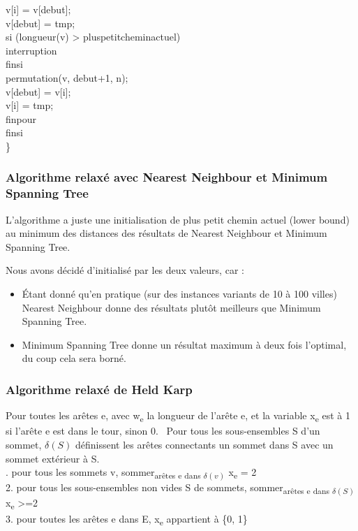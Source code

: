 \documentclass[12pt]{report}
\begin{document}
{{{{{{{\indent \indent \indent v[i] = v[debut];\\
\indent \indent \indent v[debut] = tmp;\\
\indent \indent \indent si (longueur(v) > pluspetitcheminactuel)\\
\indent\indent\indent\indent interruption\\
\indent\indent\indent finsi\\
\indent \indent \indent permutation(v, debut+1, n);\\
\indent \indent \indent v[debut] = v[i];\\
\indent \indent \indent v[i] = tmp;\\
\indent \indent finpour\\
\indent finsi \\
\}


\subsubsection{Algorithme relaxé avec Nearest Neighbour et Minimum Spanning Tree}

L'algorithme a juste une initialisation de plus petit chemin actuel (lower bound) au minimum des distances des résultats de Nearest Neighbour et Minimum Spanning Tree.

Nous avons décidé d'initialisé par les deux valeurs, car :
\begin{itemize}
\item Étant donné qu'en pratique (sur des instances variants de 10 à 100 villes) Nearest Neighbour donne des résultats plutôt meilleurs que Minimum Spanning Tree.
\item Minimum Spanning Tree donne un résultat maximum à deux fois l'optimal, du coup cela sera borné.
\end{itemize}

\subsubsection{Algorithme relaxé de Held Karp}

Pour toutes les arêtes e, avec w\textsubscript{e} la longueur de l'arête e, et la variable x\textsubscript{e} est à 1 si l'arête e est dans le tour, sinon 0. \
Pour tous les sous-ensembles S d'un sommet, \(\delta(S)\) définissent les arêtes connectants un sommet dans S avec un sommet extérieur à S.\\

. pour tous les sommets v, sommer\textsubscript{arêtes e dans \(\delta({v})\)} x\textsubscript{e} = 2 \\
2. pour tous les sous-ensembles non vides S de sommets, sommer\textsubscript{arêtes e dans \(\delta(S)\)} \\ x\textsubscript{e} >=2 \\
3. pour toutes les arêtes e dans E, x\textsubscript{e} appartient à \{0, 1\}\\

}}}}}}}
\end{document}
